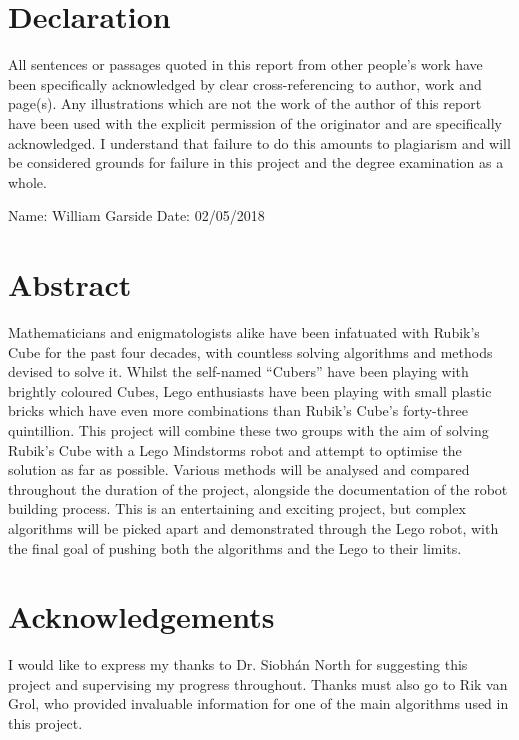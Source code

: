 \documentclass{report}
\begin{document}
	
	\newpage
	
	\renewcommand{\thechapter}{\Roman{chapter}}
	\chapter{Declaration}
	All sentences or passages quoted in this report from other people's work have been specifically acknowledged by clear cross-referencing to author, work and page(s). Any illustrations which are not the work of the author of this report have been used with the explicit permission of the originator and are specifically acknowledged. I understand that failure to do this amounts to plagiarism and will be considered grounds for failure in this project and the degree examination as a whole.
	
	Name: William Garside
	Date: 02/05/2018

	\newpage
	\chapter{Abstract}
	Mathematicians and enigmatologists alike have been infatuated with Rubik's Cube for the past four decades, with countless solving algorithms and methods devised to solve it. Whilst the self-named \enquote{Cubers} have been playing with brightly coloured Cubes, Lego enthusiasts have been playing with small plastic bricks which have even more combinations than Rubik's Cube's forty-three quintillion. This project will combine these two groups with the aim of solving Rubik's Cube with a Lego Mindstorms robot and attempt to optimise the solution as far as possible. Various methods will be analysed and compared throughout the duration of the project, alongside the documentation of the robot building process. This is an entertaining and exciting  project, but complex algorithms will be picked apart and demonstrated through the Lego robot, with the final goal of pushing both the algorithms and the Lego to their limits.
	
	\newpage
	\chapter{Acknowledgements}
	I would like to express my thanks to Dr. Siobh\'{a}n North for suggesting this project and supervising my progress throughout. Thanks must also go to Rik van Grol, who provided invaluable information for one of the main algorithms used in this project.
	
\end{document}
